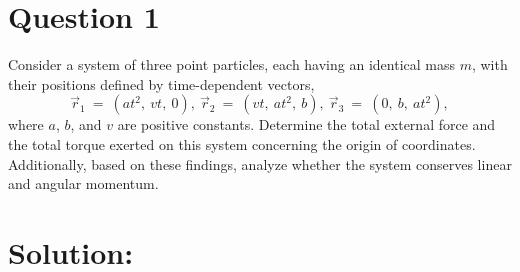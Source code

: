 \section*{Question 1}
Consider a system of three point particles, each having an identical mass $m$, with their positions defined by time-dependent vectors,
\begin{equation*}
    \vec r_{1}~=~(at^2,~vt,~0),~\vec r_{2}~=~(vt,~at^2,~b),~\vec r_{3}~=~(0,~b,~at^2), 
\end{equation*}
where $a$, $b$, and $v$ are positive constants. Determine the total external force and the total torque exerted on this system concerning the origin of coordinates. Additionally, based on these findings, analyze whether the system conserves linear and angular momentum.

\section*{Solution:}